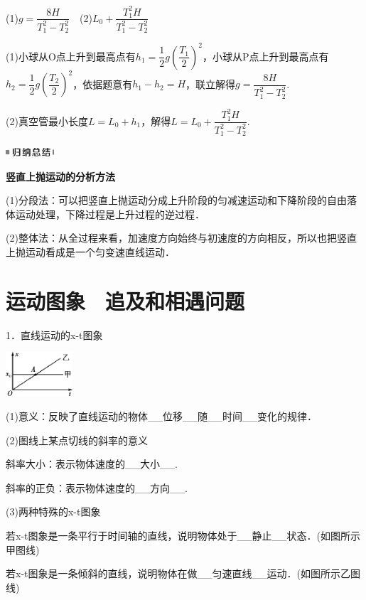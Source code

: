 \documentclass[cn,10.5pt,chinese,mac,chinesefont=founder]{elegantbook}
\begin{document}
\begin{solution}
(1)$g=\dfrac{8H}{T_1^2-T_2^2}$　(2)$L_0+\dfrac{T_1^2H}{T_1^2-T_2^2}$

(1)小球从O点上升到最高点有$h_1=\dfrac{1}{2}g(\dfrac{T_1}{2} )^2$，小球从P点上升到最高点有$h_2=\dfrac{1}{2}g(\dfrac{T_2}{2} )^2$，依据题意有$h_1-h_2=H$，联立解得$g=\dfrac{8H}{T_1^2-T_2^2}$.

(2)真空管最小长度$L=L_0+h_1$，解得$L=L_0+\dfrac{T_1^2H}{T_1^2-T_2^2}$.


\end{solution}
\begin{center}\includegraphics[width=0.71319in,height=0.12986in]{media/image13.png}

\textbf{竖直上抛运动的分析方法}
\end{center}


(1)分段法：可以把竖直上抛运动分成上升阶段的匀减速运动和下降阶段的自由落体运动处理，下降过程是上升过程的逆过程．

(2)整体法：从全过程来看，加速度方向始终与初速度的方向相反，所以也把竖直上抛运动看成是一个匀变速直线运动．
\newpage
\section{运动图象　追及和相遇问题}



1．直线运动的x-t图象

\begin{center}\includegraphics[width=0.97917in,height=0.64583in]{media/image29.png}\end{center}

(1)意义：反映了直线运动的物体\_\_位移\_\_随\_\_时间\_\_变化的规律．

(2)图线上某点切线的斜率的意义

斜率大小：表示物体速度的\_\_大小\_\_.

斜率的正负：表示物体速度的\_\_方向\_\_.

(3)两种特殊的x-t图象

若x-t图象是一条平行于时间轴的直线，说明物体处于\_\_静止\_\_状态．(如图所示甲图线)

若x-t图象是一条倾斜的直线，说明物体在做\_\_匀速直线\_\_运动．(如图所示乙图线)
\end{document}
